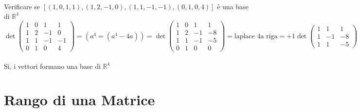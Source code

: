 \begin{esercizio}
  Verificare se $[(1,0,1,1),(1,2,-1,0),(1,1,-1,-1),(0,1,0,4)]$ è una
  base di $\mathbb{R}^4$\\
  $\det
  \begin{pmatrix}
    1 & 0 & 1 & 1\\
    1 & 2 & -1 & 0\\
    1 & 1 & -1 & -1\\
    0 & 1 & 0 & 4
  \end{pmatrix}=(a^4=(a^4-4a))=\det
  \begin{pmatrix}
    1 & 0 & 1 & 1\\
    1 & 2 & -1 & -8\\
    1 & 1 & -1 & -5\\
    0 & 1 & 0 & 0
  \end{pmatrix}=\text{laplace 4a riga}=+1\det
  \begin{pmatrix}
    1 & 1 & 1\\
    1 & -1 & -8\\
    1 & 1 & -5
  \end{pmatrix}=\det
  \begin{pmatrix}
    2 & 1 & 1\\
    0 & -1 & -8\\
    0 & -1 & -5
  \end{pmatrix}=\text{laplace 1a colonna}=2\det
  \begin{pmatrix}
    -1 & -8\\
    -1 & -5
  \end{pmatrix}=2(5-8)=-6$\\\\
  Si, i vettori formano una base di $\mathbb{R}^4$
\end{esercizio}

\section{Rango di una Matrice}

